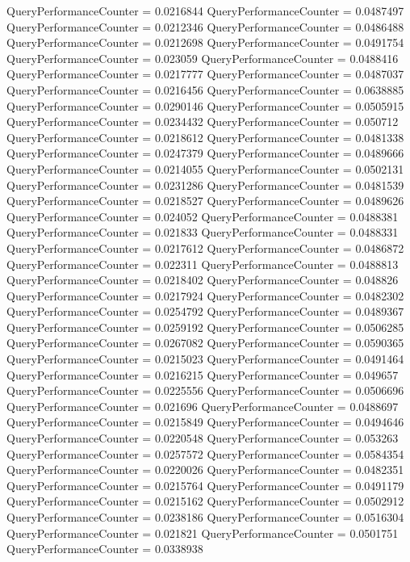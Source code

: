 \documentclass[9pt]{article}
\theoremstyle{plain}
\theoremstyle{definition}
\theoremstyle{remark}
\numberwithin{equation}{section}
\begin{document}
QueryPerformanceCounter  =  0.0216844
QueryPerformanceCounter  =  0.0487497
QueryPerformanceCounter  =  0.0212346
QueryPerformanceCounter  =  0.0486488
QueryPerformanceCounter  =  0.0212698
QueryPerformanceCounter  =  0.0491754
QueryPerformanceCounter  =  0.023059
QueryPerformanceCounter  =  0.0488416
QueryPerformanceCounter  =  0.0217777
QueryPerformanceCounter  =  0.0487037
QueryPerformanceCounter  =  0.0216456
QueryPerformanceCounter  =  0.0638885
QueryPerformanceCounter  =  0.0290146
QueryPerformanceCounter  =  0.0505915
QueryPerformanceCounter  =  0.0234432
QueryPerformanceCounter  =  0.050712
QueryPerformanceCounter  =  0.0218612
QueryPerformanceCounter  =  0.0481338
QueryPerformanceCounter  =  0.0247379
QueryPerformanceCounter  =  0.0489666
QueryPerformanceCounter  =  0.0214055
QueryPerformanceCounter  =  0.0502131
QueryPerformanceCounter  =  0.0231286
QueryPerformanceCounter  =  0.0481539
QueryPerformanceCounter  =  0.0218527
QueryPerformanceCounter  =  0.0489626
QueryPerformanceCounter  =  0.024052
QueryPerformanceCounter  =  0.0488381
QueryPerformanceCounter  =  0.021833
QueryPerformanceCounter  =  0.0488331
QueryPerformanceCounter  =  0.0217612
QueryPerformanceCounter  =  0.0486872
QueryPerformanceCounter  =  0.022311
QueryPerformanceCounter  =  0.0488813
QueryPerformanceCounter  =  0.0218402
QueryPerformanceCounter  =  0.048826
QueryPerformanceCounter  =  0.0217924
QueryPerformanceCounter  =  0.0482302
QueryPerformanceCounter  =  0.0254792
QueryPerformanceCounter  =  0.0489367
QueryPerformanceCounter  =  0.0259192
QueryPerformanceCounter  =  0.0506285
QueryPerformanceCounter  =  0.0267082
QueryPerformanceCounter  =  0.0590365
QueryPerformanceCounter  =  0.0215023
QueryPerformanceCounter  =  0.0491464
QueryPerformanceCounter  =  0.0216215
QueryPerformanceCounter  =  0.049657
QueryPerformanceCounter  =  0.0225556
QueryPerformanceCounter  =  0.0506696
QueryPerformanceCounter  =  0.021696
QueryPerformanceCounter  =  0.0488697
QueryPerformanceCounter  =  0.0215849
QueryPerformanceCounter  =  0.0494646
QueryPerformanceCounter  =  0.0220548
QueryPerformanceCounter  =  0.053263
QueryPerformanceCounter  =  0.0257572
QueryPerformanceCounter  =  0.0584354
QueryPerformanceCounter  =  0.0220026
QueryPerformanceCounter  =  0.0482351
QueryPerformanceCounter  =  0.0215764
QueryPerformanceCounter  =  0.0491179
QueryPerformanceCounter  =  0.0215162
QueryPerformanceCounter  =  0.0502912
QueryPerformanceCounter  =  0.0238186
QueryPerformanceCounter  =  0.0516304
QueryPerformanceCounter  =  0.021821
QueryPerformanceCounter  =  0.0501751
QueryPerformanceCounter  =  0.0338938
\end{document}
